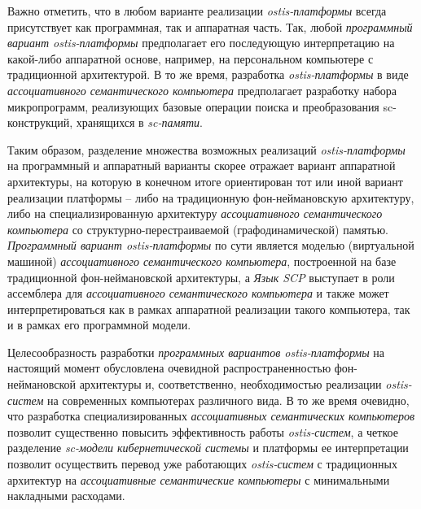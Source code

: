Важно отметить, что в любом варианте реализации \textit{ostis-платформы} всегда присутствует как программная, так и аппаратная часть. Так, любой \textit{программный вариант ostis-платформы} предполагает его последующую интерпретацию на какой-либо аппаратной основе, например, на персональном компьютере с традиционной архитектурой. В то же время, разработка \textit{ostis-платформы} в виде \textit{ассоциативного семантического компьютера} предполагает разработку набора микропрограмм, реализующих базовые операции поиска и преобразования sc-конструкций, хранящихся в \textit{sc-памяти}. 

Таким образом, разделение множества возможных реализаций \textit{ostis-платформы} на программный и аппаратный варианты скорее отражает вариант аппаратной архитектуры, на которую в конечном итоге ориентирован тот или иной вариант реализации платформы -- либо на традиционную фон-неймановскую архитектуру, либо на специализированную архитектуру \textit{ассоциативного семантического компьютера} со структурно-перестраиваемой (графодинамической) памятью. \textit{Программный вариант ostis-платформы} по сути является моделью (виртуальной машиной) \textit{ассоциативного семантического компьютера}, построенной на базе традиционной фон-неймановской архитектуры, а \textit{Язык SCP} выступает в роли ассемблера для \textit{ассоциативного семантического компьютера} и также может интерпретироваться как в рамках аппаратной реализации такого компьютера, так и в рамках его программной модели. 

Целесообразность разработки \textit{программных вариантов ostis-платформы} на настоящий момент обусловлена очевидной распространенностью фон-неймановской архитектуры и, соответственно, необходимостью реализации \textit{ostis-систем} на современных компьютерах различного вида. В то же время очевидно, что разработка специализированных \textit{ассоциативных семантических компьютеров} позволит существенно повысить эффективность работы \textit{ostis-систем}, а четкое разделение \textit{sc-модели кибернетической системы} и платформы ее интерпретации позволит осуществить перевод уже работающих \textit{ostis-систем} с традиционных архитектур на \textit{ассоциативные семантические компьютеры} с минимальными накладными расходами.

